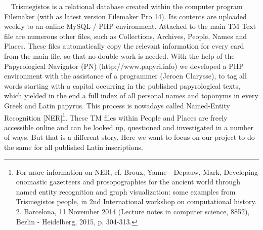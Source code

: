 \documentclass[amsthm,ebook]{saparticle}
\begin{document}
\ \ Trismegistos is a relational database created within the computer program Filemaker (with as latest version
Filemaker Pro 14). Its contents are uploaded weekly to an online MySQL / PHP environment. Attached to the main TM Text
file are numerous other files, such as Collections, Archives, People, Names and Places. These files automatically copy
the relevant information for every card from the main file, so that no double work is needed. With the help of the
Papyrological Navigator (PN) (http://www.papyri.info) we developed a PHP environment with the assistance of a
programmer (Jeroen Clarysse), to tag all words starting with a capital occurring in the published papyrological texts,
which yielded in the end a full index of all personal names and toponyms in every Greek and Latin papyrus. This process
is nowadays called Named-Entity Recognition [NER]\footnote{ For more information on NER, cf. Broux, Yanne - Depauw,
Mark, Developing onomastic gazetteers and prosopographies for the ancient world through named entity recognition and
graph visualization: some examples from Trismegistos people, in 2nd International workshop on computational history. 2.
Barcelona, 11 November 2014 (Lecture notes in computer science, 8852), Berlin - Heidelberg, 2015, p. 304-313.}. These
TM files within People and Places are freely accessible online and can be looked up, questioned and investigated in a
number of ways. But that is a different story. Here we want to focus on our project to do the same for all published
Latin inscriptions.
\end{document}
